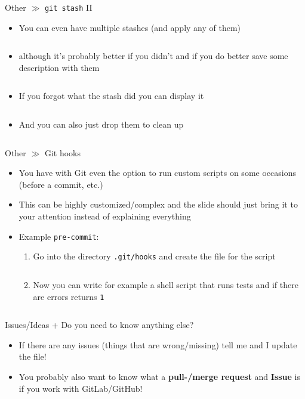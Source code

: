 \documentclass[10pt]{beamer}
\begin{document}
\begin{frame}{Other $\gg$ \texttt{git stash} II}
\begin{itemize}
	\item You can even have multiple stashes (and apply any of them)
	\inputminted[bgcolor=lightGreyCustom,fontsize=\scriptsize]{sh}{./resources/git_stash_04_stash_list.sh}
	\item although it's probably better if you didn't and if you do better save some description with them
	\inputminted[bgcolor=lightGreyCustom,fontsize=\scriptsize]{sh}{./resources/git_stash_05_stash_save.sh}
	\item If you forgot what the stash did you can display it
	\inputminted[bgcolor=lightGreyCustom,fontsize=\scriptsize]{sh}{./resources/git_stash_06_stash_show.sh}
	\item And you can also just drop them to clean up
	\inputminted[bgcolor=lightGreyCustom,fontsize=\scriptsize]{sh}{./resources/git_stash_07_drop.sh}
\end{itemize}
\end{frame}

\begin{frame}{Other $\gg$ Git hooks}
	\begin{itemize}
		\item You have with Git even the option to run custom scripts on some occasions (before a commit, etc.)
		\item This can be highly customized/complex and the slide should just bring it to your attention instead of explaining everything
		\item Example \texttt{pre-commit}:
		\begin{enumerate}
			\item Go into the directory \texttt{.git/hooks} and create the file for the script
			\inputminted[bgcolor=lightGreyCustom,fontsize=\scriptsize]{sh}{./resources/git_hooks_01_create.sh}
			\item Now you can write for example a shell script that runs tests and if there are errors returns \texttt{1}
			\inputminted[bgcolor=lightGreyCustom,fontsize=\scriptsize]{sh}{./resources/git_hooks_02_example.sh}
		\end{enumerate}
	\end{itemize}
\end{frame}

\begin{frame}{Issues/Ideas + Do you need to know anything else?}
	\begin{itemize}
		\item If there are any issues (things that are wrong/missing) tell me and I update the file!
		\item You probably also want to know what a \textbf{pull-/merge request} and \textbf{Issue} is if you work with GitLab/GitHub!
	\end{itemize}
\end{frame}
\end{document}
